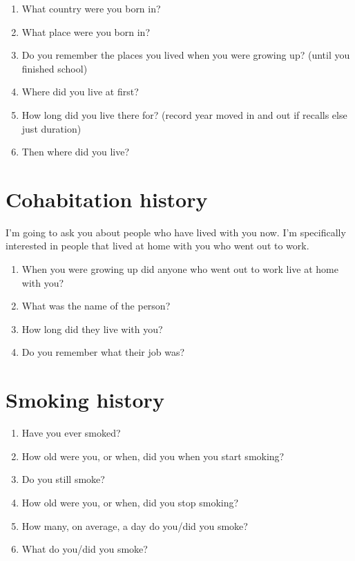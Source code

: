 \documentclass[a4paper,10pt]{article}
\begin{document}
\begin{enumerate}
\item What country were you born in? %
\item What place were you born in? %
\item Do you remember the places you lived when you were growing up? (until you finished school) 
\item Where did you live at first?
\item How long did you live there for? (record year moved in and out if recalls else just duration)
\item Then where did you live?    
\end{enumerate}

\section{Cohabitation history}
I'm going to ask you about people who have lived with you now. I'm specifically interested in people that lived at home with you who went out to work.

\begin{enumerate}

\item When you were growing up did anyone who went out to work live at home with you?
\item What was the name of the person?
\item How long did they live with you?
\item Do you remember what their job was?
\end{enumerate}


\section{Smoking history}

\begin{enumerate}
\item Have you ever smoked?
\item How old were you, or when, did you when you start smoking?
\item Do you still smoke?
\item How old were you, or when, did you stop smoking?
\item How many, on average, a day do you/did you smoke?
\item What do you/did you smoke?
\end{enumerate}
\end{document}

